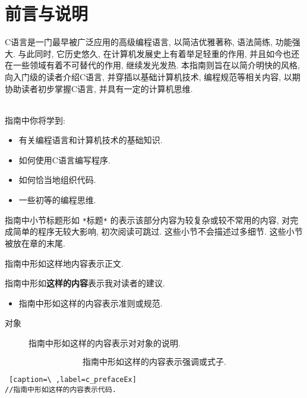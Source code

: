\chapter*{前言与说明}
 \label{前言与说明}

    C语言是一门最早被广泛应用的高级编程语言, 以简洁优雅著称, 语法简练, 功能强大. 与此同时, 它历史悠久, 在计算机发展史上有着举足轻重的作用, 并且如今也还在一些领域有着不可替代的作用, 继续发光发热. 本指南则旨在以简介明快的风格, 向入门级的读者介绍C语言, 并穿插以基础计算机技术, 编程规范等相关内容, 以期协助读者初步掌握C语言, 并具有一定的计算机思维. 

    \leavevmode \\
    指南中你将学到:
    \begin{itemize}
        \item 有关编程语言和计算机技术的基础知识.
        \item 如何使用C语言编写程序.
        \item 如何恰当地组织代码.
        \item 一些初等的编程思维.
    \end{itemize}

    \vspace*{5pt}

    指南中小节标题形如 \texttt{*}标题\texttt{*} 的表示该部分内容为较复杂或较不常用的内容, 对完成简单的程序无较大影响, 初次阅读可跳过. 这些小节不会描述过多细节. 这些小节被放在章的末尾.

    \vspace*{5pt}
    指南中形如这样地内容表示正文. 

    \vspace*{5pt}
    指南中形如\textbf{这样的内容}表示我对读者的建议.

    \begin{itemize}
        \item 指南中形如这样的内容表示准则或规范.
    \end{itemize}

    \begin{description}
        \item[对象] 指南中形如这样的内容表示对对象的说明. 
    \end{description}

    \vspace*{-20pt}
        \[ \mbox{指南中形如这样的内容表示强调或式子.} \]

\begin{lstlisting} [caption=\ ,label=c_prefaceEx]
//指南中形如这样的内容表示代码.
\end{lstlisting}

